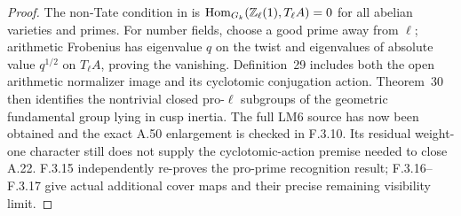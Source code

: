 \begin{proof}
The non-Tate condition in \cite[Definition 26]{AuditStix2012} is $\operatorname{Hom}_{G_k}(\mathbb Z_\ell(1),T_\ell A)=0$ for all abelian varieties and primes. For number fields, choose a good prime away from $\ell$; arithmetic Frobenius has eigenvalue $q$ on the twist and eigenvalues of absolute value $q^{1/2}$ on $T_\ell A$, proving the vanishing. Definition~29 includes both the open arithmetic normalizer image and its cyclotomic conjugation action. Theorem~30 then identifies the nontrivial closed pro-$\ell$ subgroups of the geometric fundamental group lying in cusp inertia. The full LM6 source has now been obtained and the exact A.50 enlargement is checked in F.3.10. Its residual weight-one character still does not supply the cyclotomic-action premise needed to close A.22. F.3.15 independently re-proves the pro-prime recognition result; F.3.16--F.3.17 give actual additional cover maps and their precise remaining visibility limit.
\end{proof}

